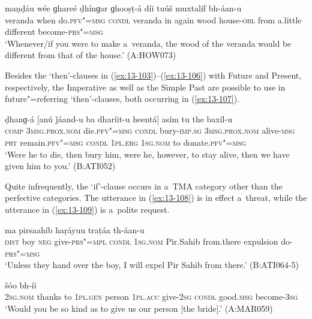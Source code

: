 \begin{exe}
\ex
\label{ex:13-106}
 maṇḍáu wée  ɡhareé ḍhínɡar ɡhooṣṭ-á díi tuúš muxtalíf bh-áan-u  \\
veranda when do.\textsc{pfv"=msg} \textsc{condl} veranda in  again wood house-\textsc{obl} from a.little different become-\textsc{prs"=msg} \\
\glt `Whenever/if you were to make a~veranda, the wood of the veranda would be different from that of the house.' (A:HOW073) 
\end{exe}

Besides the `then'-clauses in (\ref{ex:13-103})--(\ref{ex:13-106}) with Future and Present, respectively, the Imperative as well as the Simple Past are possible to use in future"=referring `then'-clauses, both occurring in (\ref{ex:13-107}).

\begin{exe}
\ex
\label{ex:13-107}
 ḍhanɡ-á  [anú ǰáand-u ba dharíit-u
  heentá]  asím tu the baxíl-u \\
\textsc{comp} \textsc{3msg.prox.nom} die.\textsc{pfv"=msg} \textsc{condl} bury-\textsc{imp.sg}  \textsc{3msg.prox.nom} alive-\textsc{msg} \textsc{prt} remain.\textsc{pfv"=msg} \textsc{condl}  \textsc{1pl.erg} \textsc{1sg.nom} to donate.\textsc{pfv"=msg} \\
\glt `Were he to die, then bury him, were he, however, to stay alive, then we have given him to you.' (B:ATI052) 
\end{exe}

Quite infrequently, the `if'-clause occurs in a~TMA category other than the perfective categories. The utterance in (\ref{ex:13-108}) is in effect a~threat, while the utterance in (\ref{ex:13-109}) is a~polite request.

\begin{exe}
\ex
\label{ex:13-108}
 ma  pirsaahíb haṛáyuu traṭáa th-áan-u \\
 \textsc{dist}{\protect\footnotemark} boy \textsc{neg} give-\textsc{prs"=mpl} \textsc{condl} \textsc{1sg.nom}  Pir.Sahib  from.there expulsion do-\textsc{prs"=msg} \\
\glt `Unless they hand over the boy, I will expel Pir Sahib from there.' (B:ATI064-5)

\ex
\label{ex:13-109}
 šóo bh-íi  \\
\textsc{2sg.nom} thanks to \textsc{1pl.gen} person \textsc{1pl.acc} give-\textsc{2sg}  \textsc{condl} good.\textsc{msg} become-\textsc{3sg} \\
\glt `Would you be so kind as to give us our person [the bride].' (A:MAR059) 
\end{exe}

